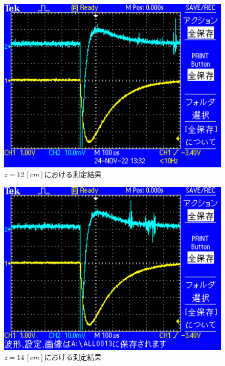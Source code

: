 \begin{figure}[H]
    \centering
    \includegraphics[scale=0.5]{images-7.pdf}
    \caption{$z=12\,[cm]$における測定結果}
\end{figure}

\begin{figure}[H]
    \centering
    \includegraphics[scale=0.5]{images-8.pdf}
    \caption{$z=14\,[cm]$における測定結果}
\end{figure}

